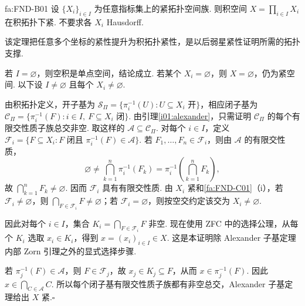 \begin{FATheorem}[B][Tychonoff 定理]{fa:FND-B01}
设 \(\displaystyle \{X_i\}_{i\in I}\) 为任意指标集上的紧拓扑空间族. 则积空间 \(\displaystyle X=\prod_{i\in I}X_i\)
在积拓扑下紧. 不要求各 \(\displaystyle X_i\) Hausdorff.
\end{FATheorem}

该定理把任意多个坐标的紧性提升为积拓扑紧性，是以后弱星紧性证明所需的拓扑支撑.

\begin{FAProof}
若 \(\displaystyle I=\varnothing\)，则空积是单点空间，结论成立. 若某个 \(\displaystyle X_i=\varnothing\)，则 \(\displaystyle X=\varnothing\)，仍为紧空间. 以下设 \(\displaystyle I\neq\varnothing\) 且每个 \(\displaystyle X_i\neq\varnothing\).

由积拓扑定义，开子基为 \(\displaystyle \mathcal S_{\Pi}=\{\pi_i^{-1}(U):U\subseteq X_i\text{ 开}\}\)，相应闭子基为 \(\displaystyle \mathcal C_{\Pi}=\{\pi_i^{-1}(F):i\in I,\ F\subseteq X_i\text{ 闭}\}\).
由引理\ref{i01:alexander}，只需证明 \(\displaystyle \mathcal C_{\Pi}\) 的每个有限交性质子族总交非空. 取这样的 \(\displaystyle \mathcal A\subseteq\mathcal C_{\Pi}\). 对每个 \(\displaystyle i\in I\)，定义 \(\displaystyle \mathcal F_i=\{F\subseteq X_i:F\text{ 闭且 }\pi_i^{-1}(F)\in\mathcal A\}\).
若 \(\displaystyle F_1,\dots,F_n\in\mathcal F_i\)，则由 \(\displaystyle \mathcal A\) 的有限交性质，
\[
\varnothing\neq\bigcap_{k=1}^{n}\pi_i^{-1}(F_k)
=\pi_i^{-1}\!\left(\bigcap_{k=1}^{n}F_k\right),
\]
故 \(\displaystyle \bigcap_{k=1}^{n}F_k\neq\varnothing\). 因而 \(\displaystyle \mathcal F_i\) 具有有限交性质. 由 \(\displaystyle X_i\) 紧和\autoref{fa:FND-C01}（i），若 \(\displaystyle \mathcal F_i\neq\varnothing\)，则 \(\displaystyle \bigcap_{F\in\mathcal F_i}F\neq\varnothing\)；若 \(\displaystyle \mathcal F_i=\varnothing\)，则按空交约定该交为 \(\displaystyle X_i\neq\varnothing\).

因此对每个 \(\displaystyle i\in I\)，集合 \(\displaystyle K_i=\bigcap_{F\in\mathcal F_i}F\)
非空. 现在使用 ZFC 中的选择公理，从每个 \(\displaystyle K_i\) 选取 \(\displaystyle x_i\in K_i\)，得到 \(\displaystyle x=(x_i)_{i\in I}\in X\). 这是本证明除 Alexander 子基定理内部 Zorn 引理之外的显式选择步骤.

若 \(\displaystyle \pi_j^{-1}(F)\in\mathcal A\)，则 \(\displaystyle F\in\mathcal F_j\)，故 \(\displaystyle x_j\in K_j\subseteq F\)，从而 \(\displaystyle x\in\pi_j^{-1}(F)\). 因此
\(\displaystyle x\in\bigcap_{C\in\mathcal A}C\).
所以每个闭子基有限交性质子族都有非空总交，Alexander 子基定理给出 \(\displaystyle X\) 紧.\hfill\(\square\)
\end{FAProof}

